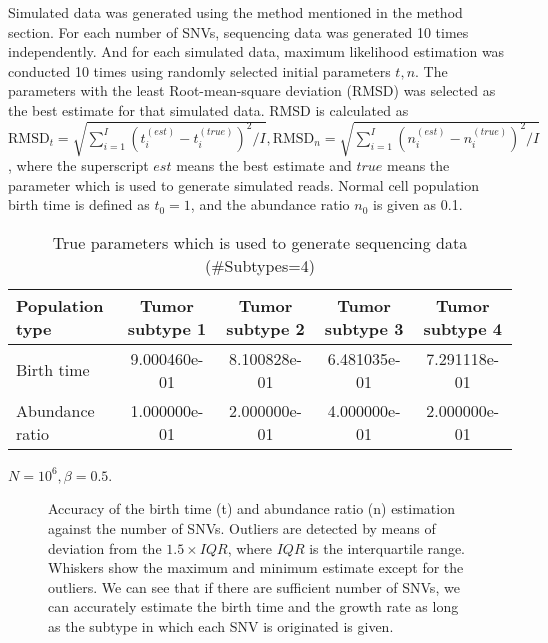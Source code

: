 \documentclass{article}
\begin{document}
Simulated data was generated using the method mentioned in the method section.%
For each number of SNVs, sequencing data was generated 10 times independently. And for each simulated data, maximum likelihood estimation was conducted 10 times using randomly selected initial parameters $t, n$. The parameters with the least Root-mean-square deviation (RMSD) was selected as the best estimate for that simulated data.
RMSD is calculated as $\mathrm{RMSD}_t = \sqrt{\sum_{i=1}^{I} (t_{i}^{(est)} - t_{i}^{(true)})^2 / I}, \mathrm{RMSD}_n = \sqrt{\sum_{i=1}^{I} (n_{i}^{(est)} - n_{i}^{(true)})^2 / I}$, where the superscript $est$ means the best estimate and $true$ means the parameter which is used to generate simulated reads. Normal cell population birth time is defined as $t_{0}=1$, and the abundance ratio $n_{0}$ is given as 0.1.

\begin{table}[H]
\begin{center}
 \caption{True parameters which is used to generate sequencing data (\#Subtypes=4)}
 \label{tab: true_parameters_4_2_original}
  \begin{tabular}[t]{lcccc}\toprule
  Population type & Tumor subtype 1 & Tumor subtype 2 & Tumor subtype 3 & Tumor subtype 4\\\midrule
  Birth time & 9.000460e-01 & 8.100828e-01 & 6.481035e-01 & 7.291118e-01\\
  Abundance ratio & 1.000000e-01 & 2.000000e-01 & 4.000000e-01 & 2.000000e-01\\\bottomrule
 \end{tabular}
\end{center}
\end{table}

$N = 10^6, \beta = 0.5$. %

\begin{figure}[H]
   \caption{
 Accuracy of the birth time (t) and abundance ratio (n) estimation against the number of SNVs. Outliers are detected by means of deviation from the $1.5 \times IQR$, where $IQR$ is the interquartile range. Whiskers show the maximum and minimum estimate except for the outliers. We can see that if there are sufficient number of SNVs, we can accurately estimate the birth time and the growth rate as long as the subtype in which each SNV is originated is given.
  }
 \label{fig: binom_subtype_given}
\end{figure}
\end{document}
